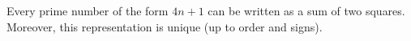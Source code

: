 Every prime number of the form $4n + 1$ can be written as a sum of two squares. Moreover, this representation is unique (up to order and signs).
